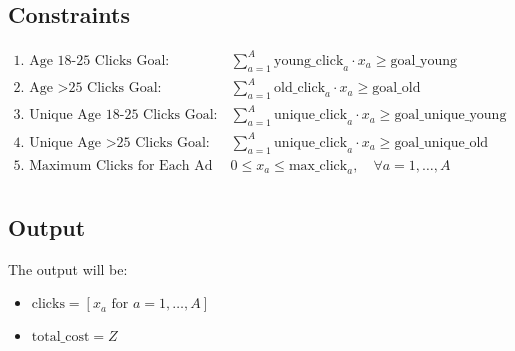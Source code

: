 \documentclass{article}
\begin{document}
\subsection*{Constraints}
\begin{align*}
\text{1. Age 18-25 Clicks Goal: } & \sum_{a=1}^{A} \text{young\_click}_{a} \cdot x_a \geq \text{goal\_young} \\
\text{2. Age >25 Clicks Goal: } & \sum_{a=1}^{A} \text{old\_click}_{a} \cdot x_a \geq \text{goal\_old} \\
\text{3. Unique Age 18-25 Clicks Goal: } & \sum_{a=1}^{A} \text{unique\_click}_{a} \cdot x_a \geq \text{goal\_unique\_young} \\
\text{4. Unique Age >25 Clicks Goal: } & \sum_{a=1}^{A} \text{unique\_click}_{a} \cdot x_a \geq \text{goal\_unique\_old} \\
\text{5. Maximum Clicks for Each Ad Type: } & 0 \leq x_a \leq \text{max\_click}_{a}, \quad \forall a = 1, \ldots, A \\
\end{align*}

\subsection*{Output}
The output will be:
\begin{itemize}
    \item \( \text{clicks} = [x_a \text{ for } a = 1, \ldots, A] \)
    \item \( \text{total\_cost} = Z \)
\end{itemize}
\end{document}
